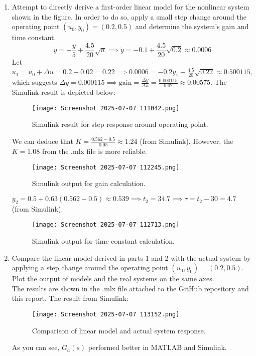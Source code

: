 \documentclass{article}
\begin{document}
\begin{enumerate}
  \item Attempt to directly derive a first-order linear model for the nonlinear system shown in the figure. In order to do so, apply a small step change around the operating point $(u_0,y_0)=(0.2,0.5)$ and determine the system's gain and time constant. \\
  \begin{equation*}
    \dot{y} = -\frac{y}{5} + \frac{4.5}{20}\sqrt{u} \implies \dot{y} = -0.1 + \frac{4.5}{20}\sqrt{0.2} \approx 0.0006
  \end{equation*}
  Let $u_1 = u_0 + \Delta u = 0.2 + 0.02 = 0.22 \implies 0.0006 = -0.2y_1 + \frac{4.5}{20}\sqrt{0.22} \approx 0.500115$, which suggests $\Delta y = 0.000115 \implies \text{gain} = \frac{\Delta y}{\Delta u} = \frac{0.000115}{0.02} \approx 0.00575$. The Simulink result is depicted below:
  \begin{figure}[h!]
    \centering
    \texttt{[image: Screenshot 2025-07-07 111042.png]}
    \caption{Simulink result for step response around operating point.}
    \label{fig:fig1}
  \end{figure}
  We can deduce that $K = \frac{0.562-0.5}{0.05} \approx 1.24$ (from Simulink). However, the $K=1.08$ from the .mlx file is more reliable.
  \begin{figure}[h!]
    \centering
    \texttt{[image: Screenshot 2025-07-07 112245.png]}
    \caption{Simulink output for gain calculation.}
    \label{fig:fig2}
  \end{figure}
  $y_2 = 0.5 + 0.63 (0.562 - 0.5) \approx 0.539 \implies t_2 = 34.7 \implies \tau = t_2 - 30 = 4.7$ (from Simulink).
  \begin{figure}[h!]
    \centering
    \texttt{[image: Screenshot 2025-07-07 112713.png]}
    \caption{Simulink output for time constant calculation.}
    \label{fig:fig3}
  \end{figure}

  \item Compare the linear model derived in parts 1 and 2 with the actual system by applying a step change around the operating point $(u_0,y_0)=(0.2,0.5)$. Plot the output of models and the real systems on the same axes. \\
  The results are shown in the .mlx file attached to the GitHub repository and this report. The result from Simulink:
  \begin{figure}[h!]
    \centering
    \texttt{[image: Screenshot 2025-07-07 113152.png]}
    \caption{Comparison of linear model and actual system response.}
    \label{fig:fig4}
  \end{figure}
  As you can see, $G_a(s)$ performed better in MATLAB and Simulink.


\end{enumerate}
\end{document}
